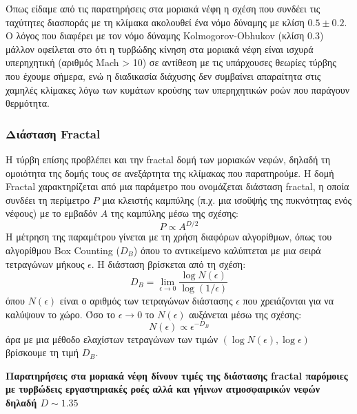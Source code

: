 \documentclass[a4paper,12pt]{memoir}
\begin{document}
Όπως είδαμε από τις παρατηρήσεις στα μοριακά νέφη η σχέση που συνδέει τις ταχύτητες διασποράς με τη κλίμακα ακολουθεί ένα νόμο δύναμης με κλίση $0.5 \pm 0.2$.  Ο λόγος που διαφέρει με τον νόμο δύναμης Kolmogorov-Obhukov (κλίση $0.3$) μάλλον οφείλεται στο ότι η τυρβώδης κίνηση στα μοριακά νέφη είναι ισχυρά υπερηχητική (αριθμός Mach > 10) σε αντίθεση με τις υπάρχουσες θεωρίες τύρβης που έχουμε σήμερα, ενώ η διαδικασία διάχυσης δεν συμβαίνει απαραίτητα στις χαμηλές κλίμακες λόγω των κυμάτων κρούσης των υπερηχητικών ροών που παράγουν θερμότητα.

\subsubsection{Διάσταση Fractal}
Η τύρβη επίσης προβλέπει και την fractal δομή των μοριακών νεφών, δηλαδή τη ομοιότητα της δομής τους σε ανεξάρτητα της κλίμακας που παρατηρούμε. 
Η δομή Fractal χαρακτηρίζεται από μια παράμετρο που ονομάζεται διάσταση fractal, η οποία συνδέει τη περίμετρο $P$ μια κλειστής καμπύλης (π.χ. μια ισοϋψής της πυκνότητας ενός νέφους) με το εμβαδόν $A$ της καμπύλης μέσω της σχέσης:
\begin{equation}
P\propto A^{D/2}
\end{equation}
Η μέτρηση της παραμέτρου γίνεται με τη χρήση διαφόρων αλγορίθμων, όπως του αλγορίθμου Box Counting ($D_B$) όπου το αντικείμενο καλύπτεται με μια σειρά τετραγώνων μήκους $\epsilon$. Η διάσταση βρίσκεται από τη σχέση:
\begin{equation}
D_B = \lim_{\epsilon \to 0} \frac{\log N(\epsilon)}{\log (1/\epsilon)}
\end{equation}
όπου $N(\epsilon)$ είναι ο αριθμός των τετραγώνων διάστασης $\epsilon$ που χρειάζονται για να καλύψουν το χώρο. Όσο το $\epsilon \to  0$ το $N(\epsilon)$ αυξάνεται μέσω της σχέσης:
\begin{equation}
N(\epsilon) \propto \epsilon ^{-D_B}
\end{equation}
άρα με μια μέθοδο ελαχίστων τετραγώνων των τιμών $\left(\log N(\epsilon),\log \epsilon\right)$ βρίσκουμε τη τιμή $D_B$.

\textbf{Παρατηρήσεις στα μοριακά νέφη δίνουν τιμές της διάστασης fractal παρόμοιες με τυρβώδεις εργαστηριακές ροές αλλά και γήινων ατμοσφαιρικών νεφών δηλαδή $D\sim 1.35$}
 
 
\end{document}
